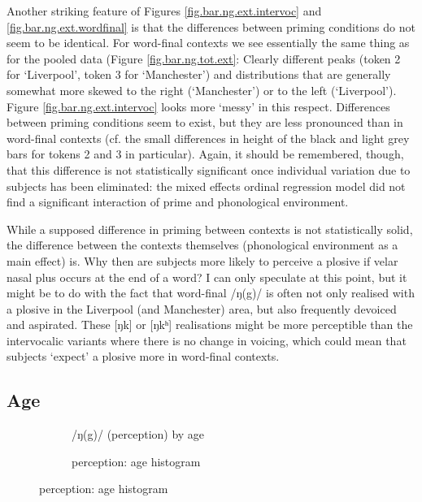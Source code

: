 Another striking feature of Figures \ref{fig.bar.ng.ext.intervoc} and \ref{fig.bar.ng.ext.wordfinal} is that the differences between priming conditions do not seem to be identical.
For word-final contexts we see essentially the same thing as for the pooled data (Figure \ref{fig.bar.ng.tot.ext}: Clearly different peaks (token 2 for `Liverpool', token 3 for `Manchester') and distributions that are generally somewhat more skewed to the right (`Manchester') or to the left (`Liverpool').
Figure \ref{fig.bar.ng.ext.intervoc} looks more `messy' in this respect.
Differences between priming conditions seem to exist, but they are less pronounced than in word-final contexts (cf. the small differences in height of the black and light grey bars for tokens 2 and 3 in particular).
Again, it should be remembered, though, that this difference is not statistically significant once individual variation due to subjects has been eliminated: the mixed effects ordinal regression model did not find a significant interaction of prime and phonological environment.

While a supposed difference in priming between contexts is not statistically solid, the difference between the contexts themselves (phonological environment as a main effect) is.
Why then are subjects more likely to perceive a plosive if velar nasal plus occurs at the end of a word?
I can only speculate at this point, but it might be to do with the fact that word-final /ŋ(g)/ is often not only realised with a plosive in the Liverpool (and Manchester) area, but also frequently devoiced and aspirated.
These [ŋk] or [ŋkʰ] realisations might be more perceptible than the intervocalic variants where there is no change in voicing, which could mean that subjects `expect' a plosive more in word-final contexts.

\subsection{Age}
\label{sec.perc_res.ng.age}

\begin{figure}[h]
	\centering
	\begin{subfigure}{.49\textwidth}
		\centering
			\resizebox{\linewidth}{!}{} 
		\caption{/ŋ(g)/ (perception)  by age}
		\label{fig.scatter.ng.ext.age}
	\end{subfigure}
	\begin{subfigure}{.49\textwidth}
		\centering
			\resizebox{\linewidth}{!}{} 
		\caption{perception: age histogram}
		\label{fig.hist.ext.age}
	\end{subfigure}			
\end{figure}

